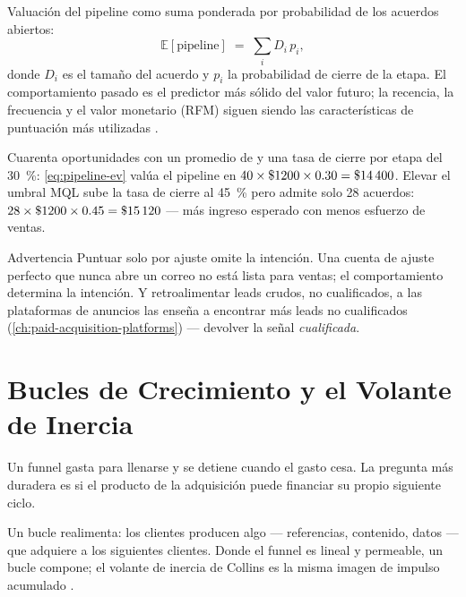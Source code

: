 Valuación del pipeline como suma ponderada por probabilidad de los acuerdos abiertos:
\begin{equation}\label{eq:pipeline-ev}
  \mathbb{E}[\text{pipeline}] \;=\; \sum_{i} D_i\,p_i,
\end{equation}
donde $D_i$ es el tamaño del acuerdo y $p_i$ la probabilidad de cierre de la etapa. El comportamiento pasado es el predictor más sólido del valor futuro; la recencia, la frecuencia y el valor monetario (RFM) siguen siendo las características de puntuación más utilizadas \parencite{fader2005rfm,bult1995optimal}.

\begin{example}
Cuarenta oportunidades con un promedio de  y una tasa de cierre por etapa del \qty{30}{\percent}: \cref{eq:pipeline-ev} valúa el pipeline en $40\times\$\num{1200}\times0.30=\$\num{14400}$. Elevar el umbral MQL sube la tasa de cierre al \qty{45}{\percent} pero admite solo \num{28} acuerdos: $28\times\$\num{1200}\times0.45=\$\num{15120}$ --- más ingreso esperado con menos esfuerzo de ventas.
\end{example}

\begin{admonition}{Advertencia}
Puntuar solo por ajuste omite la intención. Una cuenta de ajuste perfecto que nunca abre un correo no está lista para ventas; el comportamiento determina la intención. Y retroalimentar leads crudos, no cualificados, a las plataformas de anuncios las enseña a encontrar más leads no cualificados (\cref{ch:paid-acquisition-platforms}) --- devolver la señal \emph{cualificada}.
\end{admonition}

\section{Bucles de Crecimiento y el Volante de Inercia}\label{sec:growth-loops}

Un funnel gasta para llenarse y se detiene cuando el gasto cesa. La pregunta más duradera es si el producto de la adquisición puede financiar su propio siguiente ciclo.

Un bucle realimenta: los clientes producen algo --- referencias, contenido, datos --- que adquiere a los siguientes clientes. Donde el funnel es lineal y permeable, un bucle compone; el volante de inercia de Collins es la misma imagen de impulso acumulado \parencite{collins2001good,ellis2017hacking}.

